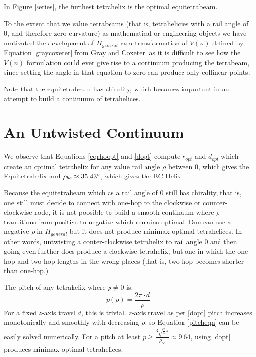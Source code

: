 \documentclass[11pt]{article}
\begin{document}
In Figure \ref{series}, the furthest tetrahelix is the optimal equitetrabeam.

To the extent that we value tetrabeams (that is, tetrahelicies with a rail angle of $0$,
and therefore zero curvature) as mathematical or engineering objects
we have motivated the development of $H_{general}$ as a transformation of $V(n)$ defined by
Equation \eqref{graycoxeter} from Gray and Coxeter, as it is difficult to see how
the $V(n)$ 
formulation could ever give rise to a continuum producing the tetrabeam,
since setting the angle in that equation to zero can produce only collinear points.

Note that the equitetrabeam has chirality, which becomes important in our attempt to build a
continuum of tetrahelices.

\section{An Untwisted Continuum}

We observe that Equations \eqref{eqrhoopt} and \eqref{dopt} compute $r_{opt}$ and $d_{opt}$ which
create an optimal tetrahelix for any value rail angle $\rho$ between $0$, which
gives the Equitetrahelix and
$\rho_{bc} \approx 35.43 \degree$, which gives the BC Helix.

 Because the equitetrabeam which as a rail angle of $0$ still has
 chirality, that is, one still must decide to connect with one-hop to
 the clockwise or counter-clockwise node, it is not poosible to build
 a smooth continuum where $\rho$ transitions from positive to negative
 which remains optimal. One can use a negative $\rho$ in $H_{general}$
 but it does not produce minimax optimal tetrahelices. In other words,
 untwisting a conter-clockwise tetrahelix to rail angle $0$ and then going
even further does produce a clockwise tetrahelix, but one in which the
 one-hop and two-hop lengths in the wrong places (that is, two-hop
 becomes shorter than one-hop.)
 


The pitch of any tetrahelix 
where $\rho \neq 0$ is:
\begin{equation}
  \label{pitcheqn}
p(\rho) = \frac{2 \pi  \cdot d}{\rho}
\end{equation}
For a fixed $z$-axis travel $d$, this is trivial. 
$z$-axis travel as per \eqref{dopt} pitch increases monotonically and smoothly with decreasing $\rho$, so
Equation \eqref{pitcheqn} can be easily solved numerically.
For a pitch at least $ p \geq \frac{3  \sqrt{\frac{2}{5}}  \pi}{\rho_{bc}} \approx 9.64 $,
using \eqref{dopt} produces minimax optimal tetrahelices.
\end{document}
